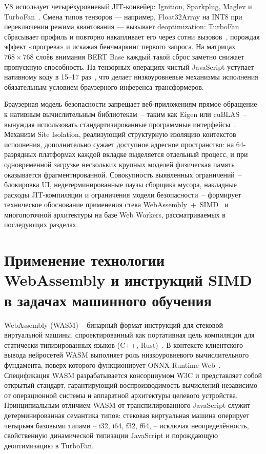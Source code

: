 V8 использует четырёхуровневый JIT-конвейер: Ignition, Sparkplug, Maglev и TurboFan~\cite{v8maglev2023}. Смена типов тензоров — например, Float32Array на INT8 при переключении режима квантования — вызывает deoptimization: TurboFan сбрасывает профиль и повторно накапливает его через сотни вызовов~\cite{jia2024empowering}, порождая эффект «прогрева» и искажая бенчмаркинг первого запроса. На матрицах $768 \times 768$ слоёв внимания BERT Base каждый такой сброс заметно снижает пропускную способность. На тензорных операциях чистый JavaScript уступает нативному коду в 15–17 раз~\cite{wang2024anatomizing}, что делает низкоуровневые механизмы исполнения обязательным условием браузерного инференса трансформеров.

Браузерная модель безопасности запрещает веб-приложениям прямое обращение к нативным вычислительным библиотекам~– таким как Eigen или cuBLAS~– вынуждая использовать стандартизированные программные интерфейсы~\cite{jia2024empowering}. Механизм Site Isolation, реализующий структурную изоляцию контекстов исполнения, дополнительно сужает доступное адресное пространство: на 64-разрядных платформах каждой вкладке выделяется отдельный процесс, и при одновременной загрузке нескольких крупных моделей физическая память оказывается фрагментированной. Совокупность выявленных ограничений~– блокировка UI, недетерминированные паузы сборщика мусора, накладные расходы JIT-компиляции и ограничения модели безопасности~– формирует техническое обоснование применения стека WebAssembly~+~SIMD~\cite{zhang2024wasm} и многопоточной архитектуры на базе Web Workers, рассматриваемых в последующих разделах.


\section{Применение технологии WebAssembly и инструкций SIMD в задачах машинного обучения} \label{sec:применение_технологии_webassembly_и_инструкций_simd_в_задачах_машинного_обучения}

WebAssembly (WASM) – бинарный формат инструкций для стековой виртуальной машины, спроектированный как портативная цель компиляции для статически типизированных языков (C++, Rust)~\cite{zhang2024wasm}. В контексте клиентского вывода нейросетей WASM выполняет роль низкоуровневого вычислительного фундамента, поверх которого функционирует ONNX Runtime Web~\cite{wang2024anatomizing, xu2024ondevice}. Спецификация WASM разрабатывается консорциумом W3C и представляет собой открытый стандарт, гарантирующий воспроизводимость вычислений независимо от операционной системы и аппаратной архитектуры целевого устройства. Принципиальным отличием WASM от транспилированного JavaScript служит детерминированная семантика типов: стековая виртуальная машина оперирует четырьмя базовыми типами – i32, i64, f32, f64, – исключая неопределённость, свойственную динамической типизации JavaScript и порождающую деоптимизацию в TurboFan.

